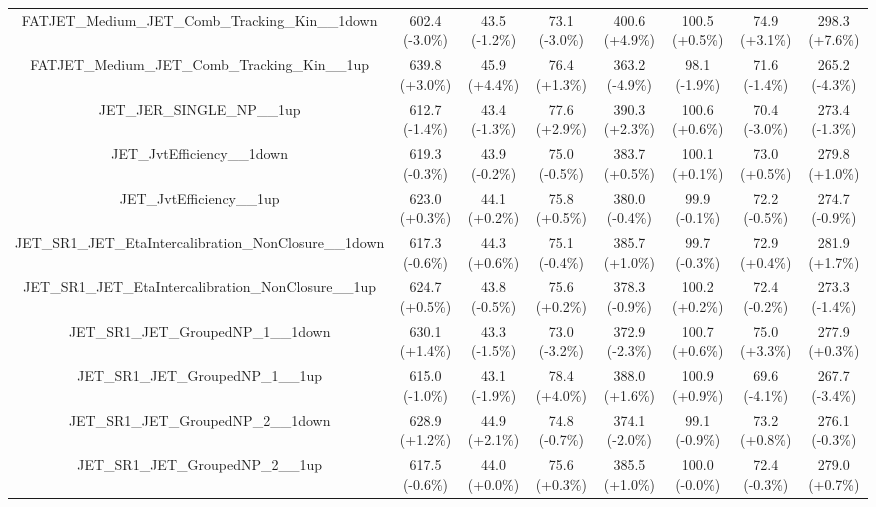 \begin{table}[htbp!]
\begin{tiny}
\begin{center}
\begin{tabular}{c|c|c|c||c|c|c|c}
FATJET\_Medium\_JET\_Comb\_Tracking\_Kin\_\_1down            & 602.4     (-3.0\%) & 43.5      (-1.2\%) & 73.1      (-3.0\%) & 400.6     (+4.9\%) & 100.5     (+0.5\%) & 74.9      (+3.1\%) & 298.3     (+7.6\%) \\ 
FATJET\_Medium\_JET\_Comb\_Tracking\_Kin\_\_1up              & 639.8     (+3.0\%) & 45.9      (+4.4\%) & 76.4      (+1.3\%) & 363.2     (-4.9\%) & 98.1      (-1.9\%) & 71.6      (-1.4\%) & 265.2     (-4.3\%) \\ 
JET\_JER\_SINGLE\_NP\_\_1up                                  & 612.7     (-1.4\%) & 43.4      (-1.3\%) & 77.6      (+2.9\%) & 390.3     (+2.3\%) & 100.6     (+0.6\%) & 70.4      (-3.0\%) & 273.4     (-1.3\%) \\ 
JET\_JvtEfficiency\_\_1down                                  & 619.3     (-0.3\%) & 43.9      (-0.2\%) & 75.0      (-0.5\%) & 383.7     (+0.5\%) & 100.1     (+0.1\%) & 73.0      (+0.5\%) & 279.8     (+1.0\%) \\ 
JET\_JvtEfficiency\_\_1up                                    & 623.0     (+0.3\%) & 44.1      (+0.2\%) & 75.8      (+0.5\%) & 380.0     (-0.4\%) & 99.9      (-0.1\%) & 72.2      (-0.5\%) & 274.7     (-0.9\%) \\ 
JET\_SR1\_JET\_EtaIntercalibration\_NonClosure\_\_1down      & 617.3     (-0.6\%) & 44.3      (+0.6\%) & 75.1      (-0.4\%) & 385.7     (+1.0\%) & 99.7      (-0.3\%) & 72.9      (+0.4\%) & 281.9     (+1.7\%) \\ 
JET\_SR1\_JET\_EtaIntercalibration\_NonClosure\_\_1up        & 624.7     (+0.5\%) & 43.8      (-0.5\%) & 75.6      (+0.2\%) & 378.3     (-0.9\%) & 100.2     (+0.2\%) & 72.4      (-0.2\%) & 273.3     (-1.4\%) \\ 
JET\_SR1\_JET\_GroupedNP\_1\_\_1down                         & 630.1     (+1.4\%) & 43.3      (-1.5\%) & 73.0      (-3.2\%) & 372.9     (-2.3\%) & 100.7     (+0.6\%) & 75.0      (+3.3\%) & 277.9     (+0.3\%) \\ 
JET\_SR1\_JET\_GroupedNP\_1\_\_1up                           & 615.0     (-1.0\%) & 43.1      (-1.9\%) & 78.4      (+4.0\%) & 388.0     (+1.6\%) & 100.9     (+0.9\%) & 69.6      (-4.1\%) & 267.7     (-3.4\%) \\ 
JET\_SR1\_JET\_GroupedNP\_2\_\_1down                         & 628.9     (+1.2\%) & 44.9      (+2.1\%) & 74.8      (-0.7\%) & 374.1     (-2.0\%) & 99.1      (-0.9\%) & 73.2      (+0.8\%) & 276.1     (-0.3\%) \\ 
JET\_SR1\_JET\_GroupedNP\_2\_\_1up                           & 617.5     (-0.6\%) & 44.0      (+0.0\%) & 75.6      (+0.3\%) & 385.5     (+1.0\%) & 100.0     (-0.0\%) & 72.4      (-0.3\%) & 279.0     (+0.7\%) \\ 

\end{tabular}
\end{center}
\end{tiny}
\end{table}
